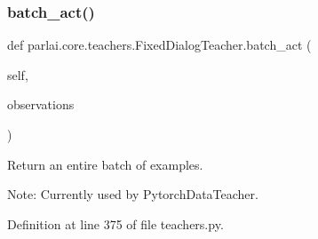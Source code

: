 \subsubsection{\texorpdfstring{batch\+\_\+act()}{batch\_act()}}
{\footnotesize\ttfamily def parlai.\+core.\+teachers.\+Fixed\+Dialog\+Teacher.\+batch\+\_\+act (\begin{DoxyParamCaption}\item[{}]{self,  }\item[{}]{observations }\end{DoxyParamCaption})}

\begin{DoxyVerb}Return an entire batch of examples.

Note: Currently used by PytorchDataTeacher.
\end{DoxyVerb}
 

Definition at line 375 of file teachers.\+py.


